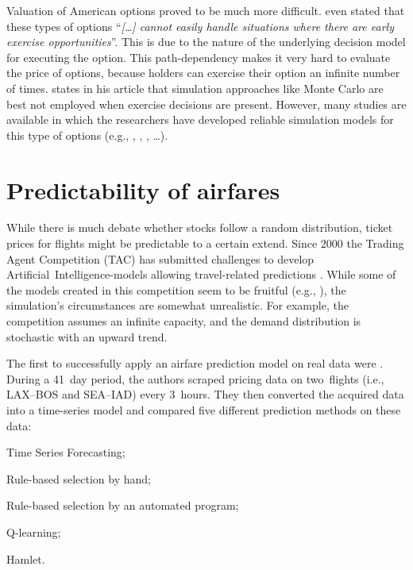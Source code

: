 Valuation of American options proved to be much more difficult.  even stated that these types of options ``\textit{[\ldots] cannot easily handle situations where there are early exercise opportunities}''. This is due to the nature of the underlying decision model for executing the option. This path-dependency makes it very hard to evaluate the price of options, because holders can exercise their option an infinite number of times.  states in his article that simulation approaches like Monte Carlo are best not employed when exercise decisions are present. However, many studies are available in which the researchers have developed reliable simulation models for this type of options (e.g., , , , \ldots).


\section{Predictability of airfares}
\label{sec:PredictabilityOfAirfares}
While there is much debate whether stocks follow a random distribution, ticket prices for flights might be predictable to a certain extend. Since 2000 the Trading Agent Competition (TAC) has submitted challenges to develop Artificial~Intelligence-models allowing travel-related predictions . While some of the models created in this competition seem to be fruitful (e.g., ), the simulation's circumstances are somewhat unrealistic. For example, the competition assumes an infinite capacity, and the demand distribution is stochastic with an upward trend.

The first to successfully apply an airfare prediction model on real data were . During a 41~day period, the authors scraped pricing data on two~flights (i.e., LAX--BOS and SEA--IAD) every 3~hours. They then converted the acquired data into a time-series model and compared five different prediction methods on these data:
\begin{inparaenum}
\item Time Series Forecasting;
\item Rule-based selection by hand;
\item Rule-based selection by an automated program;
\item Q-learning;
\item Hamlet.
\end{inparaenum}

